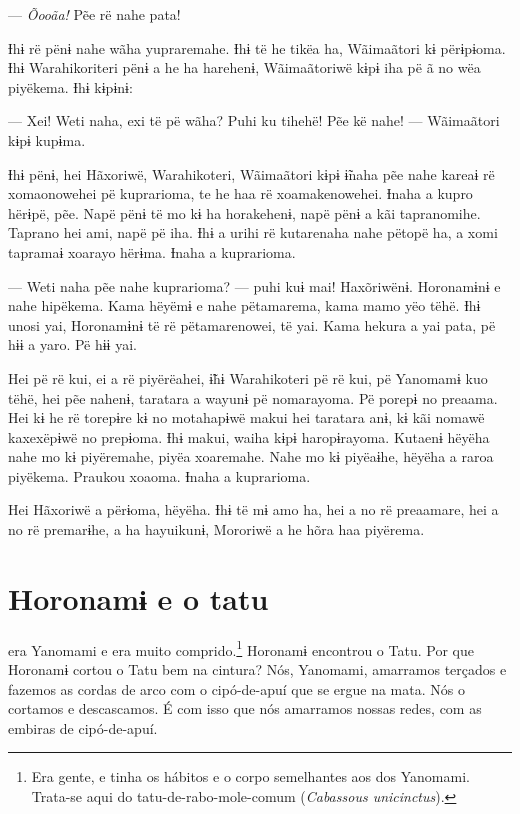 --- \textit{Õooãa!} Pẽe rë nahe pata! 

Ɨhɨ rë pënɨ nahe wãha yupraremahe. Ɨhɨ të he tikëa ha, Wãimaãtori kɨ
përɨpɨoma. Ɨhɨ Warahikoriteri pënɨ a he ha harehenɨ, Wãimaãtoriwë kɨpɨ
iha pë ã no wëa piyëkema. Ɨhɨ kɨpɨnɨ:

--- Xei! Weti naha, exi të pë wãha? Puhi ku tihehë! Pẽe kë nahe! ---
Wãimaãtori kɨpɨ kupɨma.

Ɨhɨ pënɨ, hei Hãxoriwë, Warahikoteri, Wãimaãtori kɨpɨ ɨ̃naha pẽe nahe
kareaɨ rë xomaonowehei pë kuprarioma, te he haa rë xoamakenowehei. Ɨnaha
a kupro hërɨpë, pẽe. Napë pënɨ të mo kɨ ha horakehenɨ, napë pënɨ a kãi
tapranomihe. Taprano hei ami, napë pë iha. Ɨhɨ a urihi rë kutarenaha
nahe pëtopë ha, a xomi tapramaɨ xoarayo hërɨma. Ɨnaha a kuprarioma. 

--- Weti naha pẽe nahe kuprarioma? --- puhi kuɨ mai! Haxõriwënɨ. Horonamɨnɨ
e nahe hipëkema. Kama hëyëmɨ e nahe pëtamarema, kama mamo yëo tëhë. Ɨhɨ
unosi yai, Horonamɨnɨ të rë pëtamarenowei, të yai. Kama hekura a yai
pata, pë hɨɨ a yaro. Pë hɨɨ yai. 

Hei pë rë kui, ei a rë piyërëahei, ɨ̃hɨ Warahikoteri pë rë kui, pë
Yanomamɨ kuo tëhë, hei pẽe nahenɨ, taratara a wayunɨ pë nomarayoma. Pë
porepɨ no preaama. Hei kɨ he rë torepɨre kɨ no motahapɨwë makui hei
taratara anɨ, kɨ kãi nomawë kaxexëpɨwë no prepɨoma. Ɨhɨ makui, waiha
kɨpɨ haropɨrayoma. Kutaenɨ hëyëha nahe mo kɨ piyëremahe, piyëa
xoaremahe. Nahe mo kɨ piyëaɨhe, hëyëha a raroa piyëkema. Praukou xoaoma.
Ɨnaha a kuprarioma. 

Hei Hãxoriwë a përɨoma, hëyëha. Ɨhɨ të mɨ amo ha, hei a no rë preaamare,
hei a no rë premarɨhe, a ha hayuikunɨ, Mororiwë a he hõra haa piyërema.


\chapter*{Horonamɨ e o tatu\smallskip{}}

 era Yanomami e era muito comprido.\footnote{Era gente, e tinha os hábitos e o corpo semelhantes aos dos Yanomami. Trata-se aqui do tatu-de-rabo-mole-comum (\textit{Cabassous unicinctus}).}  Horonamɨ encontrou o Tatu. Por que Horonamɨ cortou o Tatu bem na cintura? Nós, Yanomami, amarramos terçados e fazemos as cordas de arco com o cipó-de-apuí que se ergue na
mata. Nós o cortamos e descascamos. É com isso que nós amarramos nossas
redes, com as embiras de cipó-de-apuí. 


